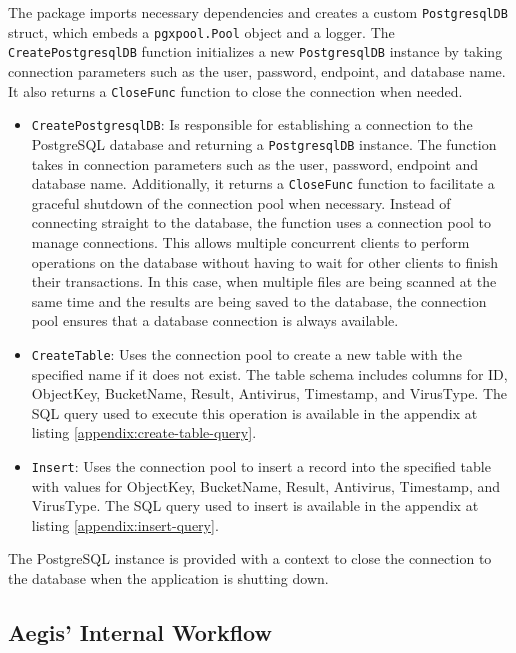 \documentclass[12pt, conference, final, a4paper, onecolumn, compsoc]{IEEEtran}
\begin{document}
The package imports necessary dependencies and creates a custom
\texttt{PostgresqlDB} struct, which embeds a \texttt{pgxpool.Pool} object and a
logger. The \texttt{CreatePostgresqlDB} function initializes a new
\texttt{PostgresqlDB} instance by taking connection parameters such as the user,
password, endpoint, and database name. It also returns a \texttt{CloseFunc}
function to close the connection when needed.

\begin{itemize}
  \item \texttt{CreatePostgresqlDB}: Is responsible for establishing a
        connection to the PostgreSQL database and returning a
        \texttt{PostgresqlDB} instance. The function takes in connection
        parameters such as the user, password, endpoint and database name.
        Additionally, it returns a \texttt{CloseFunc} function to facilitate a
        graceful shutdown of the connection pool when necessary. Instead of
        connecting straight to the database, the function uses a connection pool
        to manage connections. This allows multiple concurrent clients to
        perform operations on the database without having to wait for other
        clients to finish their transactions. In this case, when multiple files
        are being scanned at the same time and the results are being saved to
        the database, the connection pool ensures that a database connection is
        always available.
  \item \texttt{CreateTable}: Uses the connection pool to create a new table
        with the specified name if it does not exist. The table schema includes
        columns for ID, ObjectKey, BucketName, Result, Antivirus, Timestamp, and
        VirusType. The SQL query used to execute this operation is available in
        the appendix at listing \ref{appendix:create-table-query}.
  \item \texttt{Insert}: Uses the connection pool to insert a record into the
        specified table with values for ObjectKey, BucketName, Result,
        Antivirus, Timestamp, and VirusType. The SQL query used to insert is
        available in the appendix at listing \ref{appendix:insert-query}.
\end{itemize}

The PostgreSQL instance is provided with a context to close the connection to
the database when the application is shutting down.

\subsection{Aegis' Internal Workflow}
\end{document}
